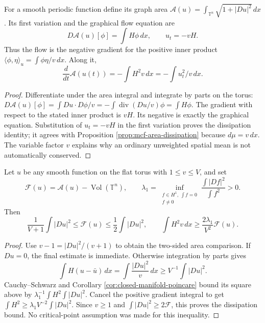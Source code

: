 \begin{proposition}\label{prop:graph-area-mobility}
For a smooth periodic function define its graph area
$\mathcal A(u)=\int_{\mathbb T^n}\sqrt{1+|Du|^2}\,dx$.
Its first variation and the graphical flow equation are
\[
 D\mathcal A(u)[\phi]=\int H\phi\,dx,
 \qquad u_t=-vH.
\]
Thus the flow is the negative gradient for the positive inner product
$\langle\phi,\eta\rangle_u=\int\phi\eta/v\,dx$.
Along it,
\[
 \frac d{dt}\mathcal A(u(t))=-\int H^2v\,dx
                              =-\int u_t^2/v\,dx.
\]
\end{proposition}
\begin{proof}
Differentiate under the area integral and integrate by parts on the torus:
$D\mathcal A(u)[\phi]=\int Du\cdot D\phi/v=-\int\operatorname{div}(Du/v)\phi=\int H\phi$.
The gradient with respect to the stated inner product is $vH$. Its negative is exactly the graphical equation. Substitution of $u_t=-vH$ in the first variation proves the dissipation identity; it agrees with Proposition \ref{prop:mcf-area-dissipation} because $d\mu=v\,dx$. The variable factor $v$ explains why an ordinary unweighted spatial mean is not automatically conserved.
\end{proof}

\begin{lemma}\label{lem:periodic-area-dissipation-gap}
Let $u$ be any smooth function on the flat torus with $1\leq v\leq V$, and set
\[
 \mathcal F(u)=\mathcal A(u)-\operatorname{Vol}(\mathbb T^n),\qquad
 \lambda_1=\inf_{\substack{f\in H^1,\ \int f=0\\f\ne0}}
            \frac{\int|Df|^2}{\int f^2}>0.
\]
Then
\[
 \frac1{V+1}\int|Du|^2\leq\mathcal F(u)\leq\frac12\int|Du|^2,
 \qquad
 \int H^2v\,dx\geq\frac{2\lambda_1}{V^2}\mathcal F(u).
\]
\end{lemma}
\begin{proof}
Use $v-1=|Du|^2/(v+1)$ to obtain the two-sided area comparison. If $Du=0$, the final estimate is immediate. Otherwise integration by parts gives
\[
 \int H(u-\bar u)\,dx=\int\frac{|Du|^2}{v}\,dx
                         \geq V^{-1}\int|Du|^2.
\]
Cauchy--Schwarz and Corollary \ref{cor:closed-manifold-poincare} bound its square above by
$\lambda_1^{-1}\int H^2\int|Du|^2$.
Cancel the positive gradient integral to get
$\int H^2\geq\lambda_1V^{-2}\int|Du|^2$.
Since $v\geq1$ and $\int|Du|^2\geq2\mathcal F$, this proves the dissipation bound. No critical-point assumption was made for this inequality.
\end{proof}

